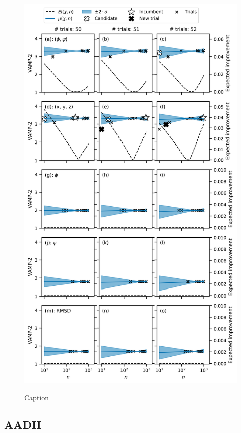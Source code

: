 \begin{figure}
    \centering
    \caption{Caption}
    \includegraphics[height=0.8\textheight]{chapters/msm_optimization/figures/ala1_opt_explainer.png}
    \label{fig:ala1_opt_expl}
\end{figure}

\subsection{AADH}

